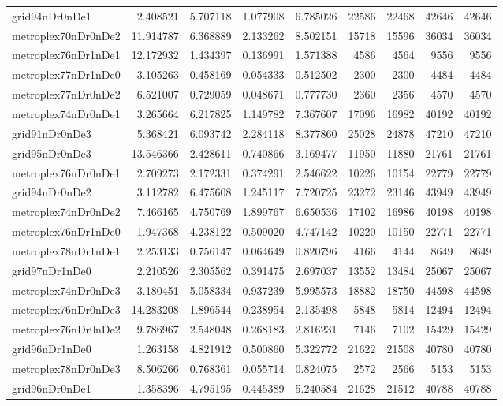 \begin{longtable}{|l|r|r|r|r|r|r|r|r|}
grid94nDr0nDe1 & 2.408521 & 5.707118 & 1.077908 & 6.785026 & 22586 & 22468 & 42646 & 42646 \\
metroplex70nDr0nDe2 & 11.914787 & 6.368889 & 2.133262 & 8.502151 & 15718 & 15596 & 36034 & 36034 \\
metroplex76nDr1nDe1 & 12.172932 & 1.434397 & 0.136991 & 1.571388 & 4586 & 4564 & 9556 & 9556 \\
metroplex77nDr1nDe0 & 3.105263 & 0.458169 & 0.054333 & 0.512502 & 2300 & 2300 & 4484 & 4484 \\
metroplex77nDr0nDe2 & 6.521007 & 0.729059 & 0.048671 & 0.777730 & 2360 & 2356 & 4570 & 4570 \\
metroplex74nDr0nDe1 & 3.265664 & 6.217825 & 1.149782 & 7.367607 & 17096 & 16982 & 40192 & 40192 \\
grid91nDr0nDe3 & 5.368421 & 6.093742 & 2.284118 & 8.377860 & 25028 & 24878 & 47210 & 47210 \\
grid95nDr0nDe3 & 13.546366 & 2.428611 & 0.740866 & 3.169477 & 11950 & 11880 & 21761 & 21761 \\
metroplex76nDr0nDe1 & 2.709273 & 2.172331 & 0.374291 & 2.546622 & 10226 & 10154 & 22779 & 22779 \\
grid94nDr0nDe2 & 3.112782 & 6.475608 & 1.245117 & 7.720725 & 23272 & 23146 & 43949 & 43949 \\
metroplex74nDr0nDe2 & 7.466165 & 4.750769 & 1.899767 & 6.650536 & 17102 & 16986 & 40198 & 40198 \\
metroplex76nDr1nDe0 & 1.947368 & 4.238122 & 0.509020 & 4.747142 & 10220 & 10150 & 22771 & 22771 \\
metroplex78nDr1nDe1 & 2.253133 & 0.756147 & 0.064649 & 0.820796 & 4166 & 4144 & 8649 & 8649 \\
grid97nDr1nDe0 & 2.210526 & 2.305562 & 0.391475 & 2.697037 & 13552 & 13484 & 25067 & 25067 \\
metroplex74nDr0nDe3 & 3.180451 & 5.058334 & 0.937239 & 5.995573 & 18882 & 18750 & 44598 & 44598 \\
metroplex76nDr0nDe3 & 14.283208 & 1.896544 & 0.238954 & 2.135498 & 5848 & 5814 & 12494 & 12494 \\
metroplex76nDr0nDe2 & 9.786967 & 2.548048 & 0.268183 & 2.816231 & 7146 & 7102 & 15429 & 15429 \\
grid96nDr1nDe0 & 1.263158 & 4.821912 & 0.500860 & 5.322772 & 21622 & 21508 & 40780 & 40780 \\
metroplex78nDr0nDe3 & 8.506266 & 0.768361 & 0.055714 & 0.824075 & 2572 & 2566 & 5153 & 5153 \\
grid96nDr0nDe1 & 1.358396 & 4.795195 & 0.445389 & 5.240584 & 21628 & 21512 & 40788 & 40788 \\

\end{longtable}
